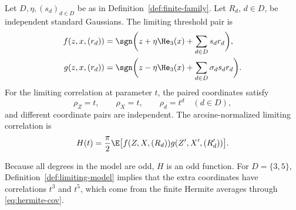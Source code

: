 \begin{definition}\label{def:limiting-model}
Let $D,\eta,(s_d)_{d\in D}$ be as in Definition~\ref{def:finite-family}.  Let $R_d$, $d\in D$, be independent standard Gaussians.  The limiting threshold pair is
\begin{align}
  f(z,x,(r_d))&=\sgn\biggl(z+\eta \He_3(x)+\sum_{d\in D}s_dr_d\biggr),\label{eq:lim-f-general}\\
  g(z,x,(r_d))&=\sgn\biggl(z-\eta \He_3(x)+\sum_{d\in D}\sigma_d s_dr_d\biggr).\label{eq:lim-g-general}
\end{align}
For the limiting correlation at parameter $t$, the paired coordinates satisfy
\[
  \rho_Z=t,
  \qquad \rho_X=t,
  \qquad \rho_d=t^d\quad(d\in D),
\]
and different coordinate pairs are independent.  The arcsine-normalized limiting correlation is
\begin{equation}\label{eq:lim-H}
  H(t)={\pi\over2}\E\bigl[f(Z,X,(R_d))g(Z',X',(R_d'))\bigr].
\end{equation}
\end{definition}

Because all degrees in the model are odd, $H$ is an odd function.  For $D=\{3,5\}$, Definition~\ref{def:limiting-model} implies that the extra coordinates have correlations $t^3$ and $t^5$, which come from the finite Hermite averages through \eqref{eq:hermite-cov}.
